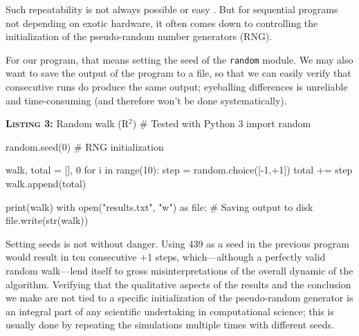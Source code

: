 Such repeatability is not always possible or easy \cite{Diethelm:2012}. But for sequential programs not depending on exotic hardware, it often comes down to controlling the initialization of the pseudo-random number generators (RNG). 

For our program, that means setting the seed of the {\tt random}  module. We may also want to save the output of the program to a file, so that we can easily verify that consecutive runs do produce the same output; eyeballing differences is unreliable and  time-consuming (and therefore won't be done systematically).

\begin{code}{\textbf{\textsc{Listing 3:}} Random walk (R$^2$)}
# Tested with Python 3
import random

random.seed(0) # RNG initialization

walk, total = [], 0
for i in range(10):
    step = random.choice([-1,+1])     
    total += step
    walk.append(total)
    
print(walk)
with open("results.txt", "w") as file: # Saving output to disk
    file.write(str(walk))
\end{code}

Setting seeds is not without danger. 
Using 439 as a seed in the previous program would result in ten consecutive +1 steps, which---although a perfectly valid random walk---lend itself to gross misinterpretations of the overall dynamic of the algorithm. 
Verifying that the qualitative aspects of the results and the conclusion we make are not tied to a specific initialization of the pseudo-random generator is an integral part of any scientific undertaking in computational science; 
this is usually done by repeating the simulations multiple times with different seeds.  




